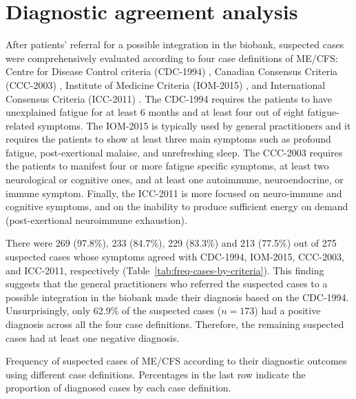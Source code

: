 \section{Diagnostic agreement analysis}
\label{sec:diagnostic-agreement-analysis}

After patients' referral for a possible integration in the biobank, suspected cases were comprehensively evaluated according to four case definitions of ME/CFS: Centre for Disease Control criteria (CDC-1994) \citep{fukuda1994ChronicFatigue}, Canadian Consensus Criteria (CCC-2003) \citep{carruthers2003MyalgicEncephalomyelitis}, Institute of Medicine Criteria (IOM-2015) \citep{instituteofmedicine2015MyalgicEncephalomyelitis}, and International Consensus Criteria (ICC-2011) \citep{carruthers2011MyalgicEncephalomyelitis}. The CDC-1994 requires the patients to have unexplained fatigue for at least 6 months and at least four out of eight fatigue-related symptoms. The IOM-2015 is typically used by general practitioners and it requires the patients to show at least three main symptoms such as profound fatigue, post-exertional malaise, and unrefreshing sleep. The CCC-2003 requires the patients to manifest four or more fatigue specific symptoms, at least two neurological or cognitive ones, and at least one autoimmune, neuroendocrine, or immune symptom. Finally, the ICC-2011 is more focused on neuro-immune and cognitive symptoms, and on the inability to produce sufficient energy on demand (post-exertional neuroimmune exhaustion). 

There were 269 (97.8\%), 233 (84.7\%), 229 (83.3\%) and 213 (77.5\%) out of 275 suspected cases whose symptoms agreed with CDC-1994, IOM-2015, CCC-2003, and ICC-2011, respectively (Table~\ref{tab:freq-cases-by-criteria}). This finding suggests that the general practitioners who referred the suspected cases to a possible integration in the biobank made their diagnosis based on the CDC-1994. Unsurprisingly, only 62.9\% of the suspected cases ($n=173$) had a positive diagnosis across all the four case definitions. Therefore, the remaining suspected cases had at least one negative diagnosis. 

\begin{table}
    \centering
    \caption[Frequency of suspected cases of ME/CFS according to their diagnostic outcomes using different case definitions]{Frequency of suspected cases of ME/CFS according to their diagnostic outcomes using different case definitions. Percentages in the last row indicate the proportion of diagnosed cases by each case definition.}
    
    \label{tab:freq-cases-by-criteria}
\end{table}

